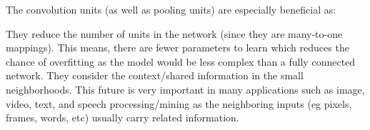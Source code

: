 \documentclass[a4paper]{article}
\begin{document}
The convolution units (as well as pooling units) are especially beneficial as:

They reduce the number of units in the network (since they are many-to-one mappings). This means, there are fewer parameters to learn which reduces the chance of overfitting as the model would be less complex than a fully connected network.
They consider the context/shared information in the small neighborhoods. This future is very important in many applications such as image, video, text, and speech processing/mining as the neighboring inputs (eg pixels, frames, words, etc) usually carry related information.
\end{document}
